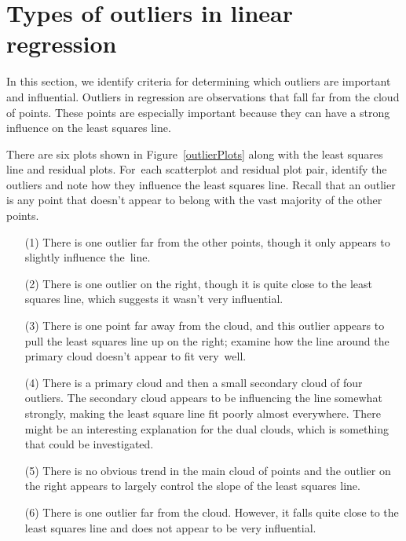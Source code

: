 \section{Types of outliers in linear regression}
\label{typesOfOutliersInLinearRegression}

In this section, we identify criteria for determining which
outliers are important and influential.
Outliers in regression are observations that fall far from
the cloud of points.
These points are especially important because they can have
a strong influence on the least squares line. 

\begin{examplewrap}
\begin{nexample}{There are six plots shown in
    Figure~\ref{outlierPlots} along with the least squares
    line and residual plots.
    For~each scatterplot and residual plot pair,
    identify the outliers and note how they influence
    the least squares line.
    Recall that an outlier is any point that doesn't appear
    to belong with the vast majority of the other points.}
  \label{outlierPlotsExample}%
  \begin{itemize}
  \item[(1)]
      There is one outlier far from the other points,
      though it only appears to slightly influence the~line.
  \item[(2)]
      There is one outlier on the right, though it is quite
      close to the least squares line, which suggests it
      wasn't very influential.
  \item[(3)]
      There is one point far away from the cloud, and this
      outlier appears to pull the least squares line up on
      the right;
      examine how the line around the primary cloud doesn't
      appear to fit very~well.
  \item[(4)]
      There is a primary cloud and then a small secondary
      cloud of four outliers.
      The secondary cloud appears to be influencing the line
      somewhat strongly, making the least square line fit
      poorly almost everywhere.
      There might be an interesting explanation for the dual
      clouds, which is something that could be investigated.
  \item[(5)]
      There is no obvious trend in the main cloud of points
      and the outlier on the right appears to largely control
      the slope of the least squares line.
  \item[(6)]
      There is one outlier far from the cloud.
      However, it falls quite close to the least squares line
      and does not appear to be very influential.
  \end{itemize}
\end{nexample}
\end{examplewrap}

